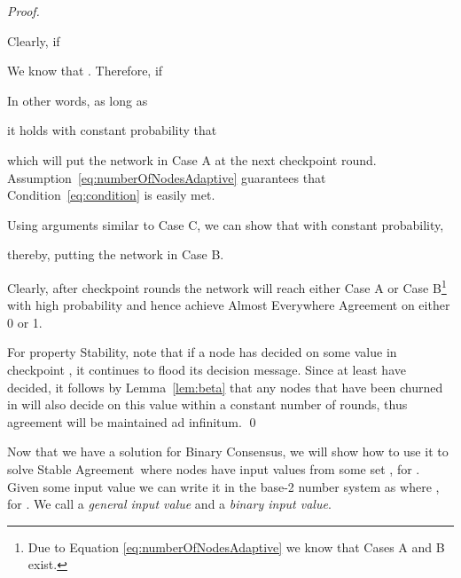 \documentclass[leqno,11pt]{article}
\newcommand{\sa}{{\sc Stable Agreement}}
\newcommand{\bc}{{\sc Binary Consensus}}
\newcommand{\onlyLong}[1]{\ifthenelse{\boolean{short}}{}{#1}}
\begin{document}
{\begin{proof}
\begin{description}
Clearly,  if 

We know that . Therefore,  if 

In other words, as long as 

it holds with constant probability that

which will put
the network in Case A at the next checkpoint round. Assumption~\eqref{eq:numberOfNodesAdaptive} guarantees that Condition~\eqref{eq:condition}
is easily met. 
\item[Case D ():] Using arguments
similar to Case C, we can show that with constant probability, 

thereby, putting the network in Case B. 
\end{description}
Clearly, after  checkpoint rounds the network
will reach either Case A or Case B\footnote{Due to Equation
\eqref{eq:numberOfNodesAdaptive} we know that Cases A and B exist.} with high probability and hence achieve Almost Everywhere
Agreement on either 0 or 1.

For property Stability, note that if a node has decided on some value 
in checkpoint , it continues to flood its decision message. Since at least
 have decided, it follows by Lemma~\ref{lem:beta} that any nodes
that have been churned in will also decide on this value within a constant
number of rounds, thus agreement will be maintained ad infinitum.
\qed
\end{proof}
}

\onlyLong{\subsection{\sa}} \label{sec:adaptiveSA}
Now that we have a solution for \bc, we will show how to use it to solve \sa\
where nodes have input values from some set , for .
Given some input value  we can write it in the base-2 number system as
 where , for . We
call  a \emph{general input value} and  a \emph{binary input value}.
\end{document}
